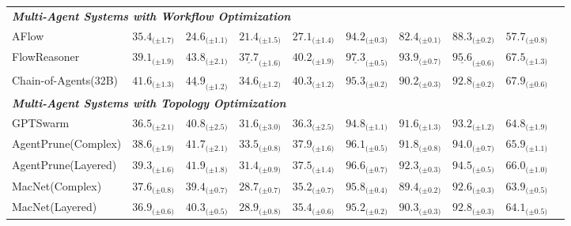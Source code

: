 \documentclass{article}
\theoremstyle{definition}
\begin{document}
\begin{table}[!t]
{\begin{tabular}{p{5cm}*{8}{c}c}
\midrule
\multicolumn{9}{l}{\textit{\textbf{Multi-Agent Systems with Workflow Optimization}}} \\
AFlow       
& $35.4_{\text{(±1.7)}}$
& $24.6_{\text{(±1.1)}}$
& $21.4_{\text{(±1.5)}}$
& $27.1_{\text{(±1.4)}}$
& $94.2_{\text{(±0.3)}}$
& $82.4_{\text{(±0.1)}}$
& $88.3_{\text{(±0.2)}}$
& $57.7_{\text{(±0.8)}}$\\

FlowReasoner 
& $39.1_{\text{(±1.9)}}$
& $43.8_{\text{(±2.1)}}$
& $\underline{37.7}_{\text{(±1.6)}}$
& $40.2_{\text{(±1.9)}}$
& $\underline{97.3}_{\text{(±0.5)}}$
& $93.9_{\text{(±0.7)}}$
& $\underline{95.6}_{\text{(±0.6)}}$
& $67.5_{\text{(±1.3)}}$\\

Chain-of-Agents(32B) 
& $41.6_{\text{(±1.3)}}$
& $\underline{44.9}_{\text{(±1.2)}}$
& $34.6_{\text{(±1.2)}}$
& $40.3_{\text{(±1.2)}}$
& $95.3_{\text{(±0.2)}}$
& $90.2_{\text{(±0.3)}}$
& $92.8_{\text{(±0.2)}}$
& $67.9_{\text{(±0.6)}}$\\

\midrule
\multicolumn{9}{l}{\textit{\textbf{Multi-Agent Systems with Topology Optimization}}} \\

GPTSwarm 
& $36.5_{\text{(±2.1)}}$
& $40.8_{\text{(±2.5)}}$
& $31.6_{\text{(±3.0)}}$
& $36.3_{\text{(±2.5)}}$
& $94.8_{\text{(±1.1)}}$
& $91.6_{\text{(±1.3)}}$
& $93.2_{\text{(±1.2)}}$
& $64.8_{\text{(±1.9)}}$\\

AgentPrune(Complex) 
& $38.6_{\text{(±1.9)}}$
& $41.7_{\text{(±2.1)}}$
& $33.5_{\text{(±0.8)}}$
& $37.9_{\text{(±1.6)}}$
& $96.1_{\text{(±0.5)}}$
& $91.8_{\text{(±0.8)}}$
& $94.0_{\text{(±0.7)}}$
& $65.9_{\text{(±1.1)}}$\\

AgentPrune(Layered) 
& $39.3_{\text{(±1.6)}}$
& $41.9_{\text{(±1.8)}}$
& $31.4_{\text{(±0.9)}}$
& $37.5_{\text{(±1.4)}}$
& $96.6_{\text{(±0.7)}}$
& $92.3_{\text{(±0.3)}}$
& $94.5_{\text{(±0.5)}}$
& $66.0_{\text{(±1.0)}}$\\

MacNet(Complex) 
& $37.6_{\text{(±0.8)}}$
& $39.4_{\text{(±0.7)}}$
& $28.7_{\text{(±0.7)}}$
& $35.2_{\text{(±0.7)}}$
& $95.8_{\text{(±0.4)}}$
& $89.4_{\text{(±0.2)}}$
& $92.6_{\text{(±0.3)}}$
& $63.9_{\text{(±0.5)}}$\\

MacNet(Layered) 
& $36.9_{\text{(±0.6)}}$
& $40.3_{\text{(±0.5)}}$
& $28.9_{\text{(±0.8)}}$
& $35.4_{\text{(±0.6)}}$
& $95.2_{\text{(±0.2)}}$
& $90.3_{\text{(±0.3)}}$
& $92.8_{\text{(±0.3)}}$
& $64.1_{\text{(±0.5)}}$\\


\end{tabular}}
\end{table}
\end{document}
